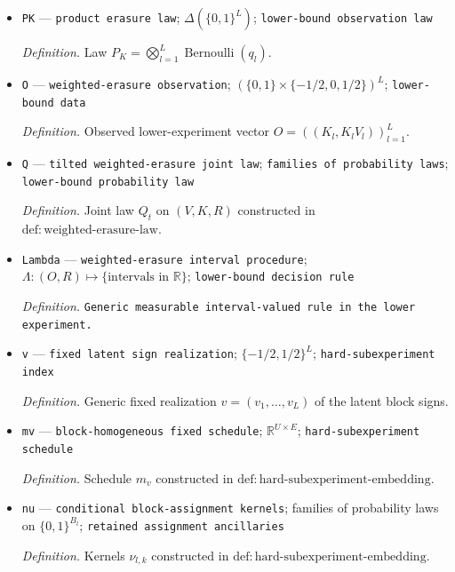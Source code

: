 \documentclass{article}
\begin{document}
\begin{itemize}
  \par\smallskip\noindent\emph{Definition.} Functional \(\tau_t=\mathbb E_{\pi_t}[T(V)]\) constructed in \(\mathrm{def{:}tilted\text{-}sign\text{-}prior}\).
  \item \texttt{PK} --- \texttt{product erasure law}; \(\Delta(\{0,1\}^L)\); \texttt{lower-\allowbreak{}bound observation law}
  \par\smallskip\noindent\emph{Definition.} Law \(P_K=\bigotimes_{l=1}^L\operatorname{Bernoulli}(q_l)\).
  \item \texttt{O} --- \texttt{weighted-\allowbreak{}erasure observation}; \((\{0,1\}\times\{-1/2,0,1/2\})^L\); \texttt{lower-\allowbreak{}bound data}
  \par\smallskip\noindent\emph{Definition.} Observed lower-experiment vector \(O=((K_l,K_lV_l))_{l=1}^L\).
  \item \texttt{Q} --- \texttt{tilted weighted-\allowbreak{}erasure joint law}; \texttt{families of probability laws}; \texttt{lower-\allowbreak{}bound probability law}
  \par\smallskip\noindent\emph{Definition.} Joint law \(Q_t\) on \((V,K,R)\) constructed in \(\mathrm{def{:}weighted\text{-}erasure\text{-}law}\).
  \item \texttt{Lambda} --- \texttt{weighted-\allowbreak{}erasure interval procedure}; \(\Lambda:(O,R)\mapsto\{\text{intervals in }\mathbb R\}\); \texttt{lower-\allowbreak{}bound decision rule}
  \par\smallskip\noindent\emph{Definition.} \texttt{Generic measurable interval-\allowbreak{}valued rule in the lower experiment.}
  \item \texttt{v} --- \texttt{fixed latent sign realization}; \(\{-1/2,1/2\}^L\); \texttt{hard-\allowbreak{}subexperiment index}
  \par\smallskip\noindent\emph{Definition.} Generic fixed realization \(v=(v_1,\ldots,v_L)\) of the latent block signs.
  \item \texttt{mv} --- \texttt{block-\allowbreak{}homogeneous fixed schedule}; \(\mathbb R^{U\times E}\); \texttt{hard-\allowbreak{}subexperiment schedule}
  \par\smallskip\noindent\emph{Definition.} Schedule \(m_v\) constructed in \(\mathrm{def{:}hard\text{-}subexperiment\text{-}embedding}\).
  \item \texttt{nu} --- \texttt{conditional block-\allowbreak{}assignment kernels}; families of probability laws on \(\{0,1\}^{B_l}\); \texttt{retained assignment ancillaries}
  \par\smallskip\noindent\emph{Definition.} Kernels \(\nu_{l,k}\) constructed in \(\mathrm{def{:}hard\text{-}subexperiment\text{-}embedding}\).

\end{itemize}
\end{document}
